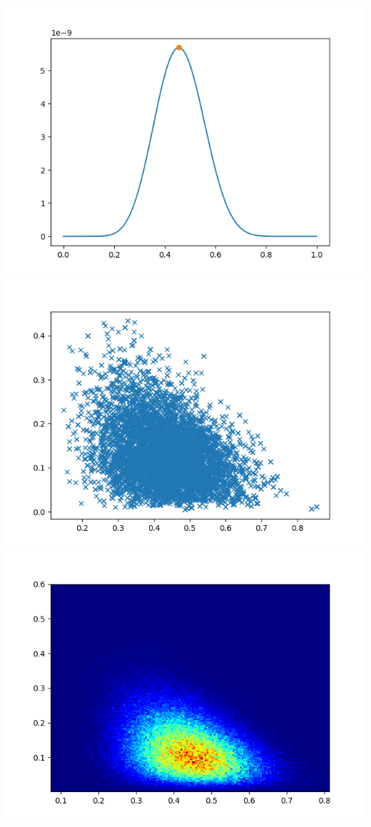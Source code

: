\documentclass[pt12]{article}
\begin{document}
\newpage

\begin{center}
\includegraphics[scale=0.5]{hip31.png}\\
\includegraphics[scale=0.5]{sc31.png}\\
\includegraphics[scale=0.5]{den31.png}\\
\end{center}
\end{document}
